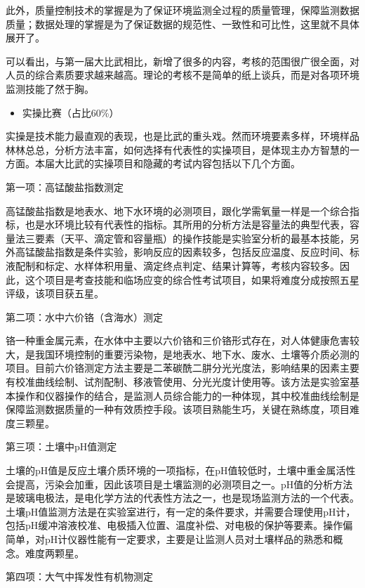 \documentclass[]{book}
\providecommand{\tightlist}{%
  \setlength{\itemsep}{0pt}\setlength{\parskip}{0pt}}
\begin{document}
此外，质量控制技术的掌握是为了保证环境监测全过程的质量管理，保障监测数据质量；数据处理的掌握是为了保证数据的规范性、一致性和可比性，这里就不具体展开了。

可以看出，与第一届大比武相比，新增了很多的内容，考核的范围很广很全面，对人员的综合素质要求越来越高。理论的考核不是简单的纸上谈兵，而是对各项环境监测技能了然于胸。

\begin{itemize}
\tightlist
\item
  实操比赛（占比60\%）
\end{itemize}

实操是技术能力最直观的表现，也是比武的重头戏。然而环境要素多样，环境样品林林总总，分析方法丰富，如何选择有代表性的实操项目，是体现主办方智慧的一方面。本届大比武的实操项目和隐藏的考试内容包括以下几个方面。

第一项：高锰酸盐指数测定

高锰酸盐指数是地表水、地下水环境的必测项目，跟化学需氧量一样是一个综合指标，也是水环境比较有代表性的指标。其所用的分析方法是容量法的典型代表，容量法三要素（天平、滴定管和容量瓶）的操作技能是实验室分析的最基本技能，另外高锰酸盐指数是条件实验，影响反应的因素较多，包括反应温度、反应时间、标液配制和标定、水样体积用量、滴定终点判定、结果计算等，考核内容较多。因此，这个项目是考查技能和临场应变的综合性考试项目，如果将难度分成按照五星评级，该项目获五星。

第二项：水中六价铬（含海水）测定

铬一种重金属元素，在水体中主要以六价铬和三价铬形式存在，对人体健康危害较大，是我国环境控制的重要污染物，是地表水、地下水、废水、土壤等介质必测的项目。目前六价铬测定方法主要是二苯碳酰二肼分光光度法，影响结果的因素主要有校准曲线绘制、试剂配制、移液管使用、分光光度计使用等。该方法是实验室基本操作和仪器操作的结合，是监测人员综合能力的一种体现，其中校准曲线绘制是保障监测数据质量的一种有效质控手段。该项目熟能生巧，关键在熟练度，项目难度三颗星。

第三项：土壤中pH值测定

土壤的pH值是反应土壤介质环境的一项指标，在pH值较低时，土壤中重金属活性会提高，污染会加重，因此该项目是土壤监测的必测项目之一。pH值的分析方法是玻璃电极法，是电化学方法的代表性方法之一，也是现场监测方法的一个代表。土壤pH值监测方法是在实验室进行，有一定的条件要求，并需要合理使用pH计，包括pH缓冲溶液校准、电极插入位置、温度补偿、对电极的保护等要素。操作偏简单，对pH计仪器性能有一定要求，主要是让监测人员对土壤样品的熟悉和概念。难度两颗星。

第四项：大气中挥发性有机物测定
\end{document}
